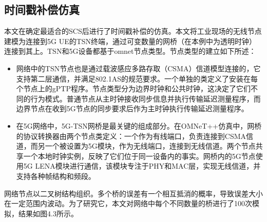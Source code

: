\documentclass[UTF8,a4paper,12pt]{ctexart}
\numberwithin{equation}{section}
\begin{document}
	\subsection{时间戳补偿仿真}
	本文在确定最适合的SCS后进行了时间戳补偿的仿真。本文将工业现场的无线节点建模为连接到5G UE的TSN终端，通过可变数量的网桥（在本例中为透明时钟）连接到其上。TSN和5G设备都基于omnet节点类型。节点类型的建立如下所述：
	\begin{itemize}
		\item 网络中的TSN节点也是通过载波感应多路存取（CSMA）信道模型连接的，它支持第二层通信，并满足802.1AS的规范要求。一个单独的类定义了安装在每个节点上的gPTP程序。节点类型分为边界时钟和公共时钟，这决定了它们不同的行为模式。普通节点从主时钟接收同步信息并执行传输延迟测量程序，而边界节点在收到5G节点的同步要求后作为主时钟执行传输延迟测量程序。
		\item 在5G网络中，5G-TSN网桥是最关键的组成部分。在OMNeT++仿真中，网桥的协议转换器由两个节点类定义：一个作为有线端口，负责连接到CSMA信道，而另一个被设置为5G模块，作为无线端口，连接到无线信道。两个节点共享一个本地时钟实例，反映了它们位于同一设备内的事实。网桥内的5G节点使用5G LENA模块进行通信，该模块专注于PHY和MAC层，实现无线信道，并支持各种帧结构和频段。
	\end{itemize}
	网络节点以二叉树结构组织。多个桥的误差有一个相互抵消的概率，导致误差大小在一定范围内波动。为了研究它，本文对网络中每个不同数量的桥进行了100次模拟，结果如图4.3所示。
	\begin{figure}[htb] 
	\end{figure}
	
\end{document}
